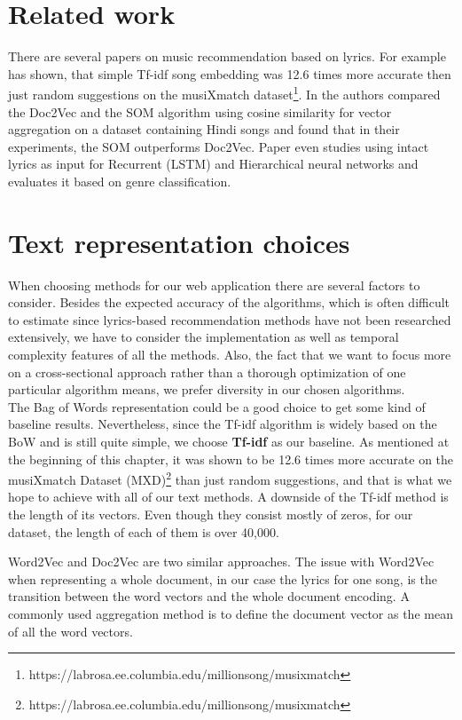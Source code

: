 \section{Related work}\label{sec:text_related_work}

 There are several papers on music recommendation based on lyrics. For example \cite{Gossi2016LyricBasedMR} has shown, that simple Tf-idf song embedding was 12.6 times more accurate then just random suggestions on the musiXmatch dataset\footnote{https://labrosa.ee.columbia.edu/millionsong/musixmatch}.  In \cite{inproceedings} the authors compared the Doc2Vec and the SOM algorithm using cosine similarity for vector aggregation on a dataset containing Hindi songs and found that in their experiments, the SOM outperforms Doc2Vec. Paper \cite{DBLP:journals/corr/Tsaptsinos17} even studies using intact lyrics as input for Recurrent (LSTM) and Hierarchical neural networks and evaluates it based on genre classification.

\section{Text representation choices}
When choosing methods for our web application there are several factors to consider. Besides the expected accuracy of the algorithms, which is often difficult to estimate since lyrics-based recommendation methods have not been researched extensively, we have to consider the implementation as well as temporal complexity features of all the methods. Also, the fact that we want to focus more on a cross-sectional approach rather than a thorough optimization of one particular algorithm means, we prefer diversity in our chosen algorithms.  \\

The Bag of Words representation could be a good choice to get some kind of baseline results. Nevertheless, since the Tf-idf algorithm is widely based on the BoW and is still quite simple, we choose \textbf{Tf-idf} as our baseline. As mentioned at the beginning of this chapter, it was shown to be 12.6 times more accurate on the musiXmatch Dataset (MXD)\footnote{https://labrosa.ee.columbia.edu/millionsong/musixmatch} than just random suggestions, and that is what we hope to achieve with all of our text methods. A downside of the Tf-idf method is the length of its vectors. Even though they consist mostly of zeros, for our dataset, the length of each of them is over 40,000. 

Word2Vec and Doc2Vec are two similar approaches. The issue with Word2Vec when representing a whole document, in our case the lyrics for one song, is the transition between the word vectors and the whole document encoding. A commonly used aggregation method is to define the document vector as the mean of all the word vectors. 

